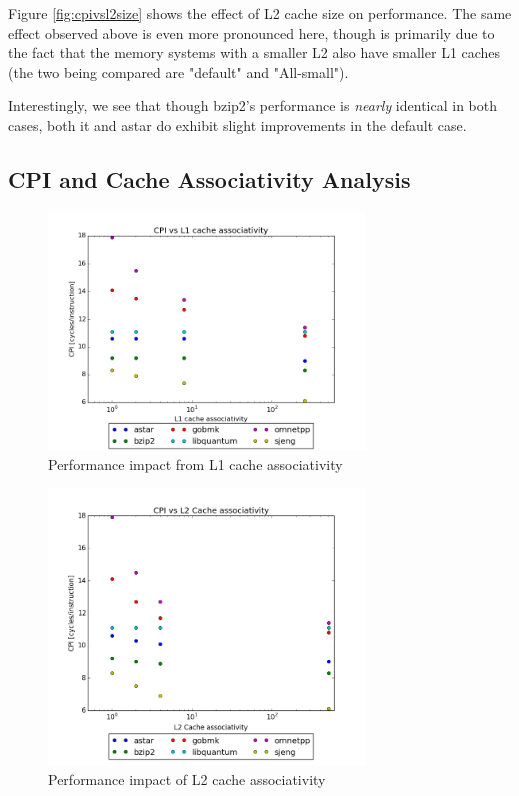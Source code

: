 \documentclass{article}
\begin{document}
Figure \ref{fig:cpivsl2size} shows the effect of L2 cache size on performance.
The same effect observed above is even more pronounced here, though is primarily
due to the fact that the memory systems with a smaller L2 also have smaller L1
caches (the two being compared are "default" and "All-small").

Interestingly, we see that though bzip2's performance is \emph{nearly} identical
in both cases, both it and astar do exhibit slight improvements in the default
case.

\subsection{CPI and Cache Associativity Analysis}

\begin{figure}[ht]
    \centering
    \includegraphics[width=0.75\textwidth]{plots/CPI_vs_L1cache_associativity.png}
    \caption{Performance impact from L1 cache associativity}
    \label{fig:cpivsl1assoc}
\end{figure}

\begin{figure}[ht]
    \centering
    \includegraphics[width=0.75\textwidth]{plots/CPI_vs_L2Cache_associativity.png}
    \caption{Performance impact of L2 cache associativity}
    \label{fig:cpivsl2assoc}
\end{figure}
\end{document}

